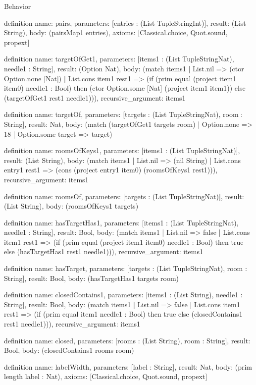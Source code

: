 \begin{lexlean}{Behavior}
\begin{semanticmodule}
definition{
  name: pairs,
  parameters: [entries : (List TupleStringInt)],
  result: (List String),
  body: (pairsMap1 entries),
  axioms: [Classical.choice, Quot.sound, propext]
}

definition{
  name: targetOfGet1,
  parameters: [items1 : (List TupleStringNat), needle1 : String],
  result: (Option Nat),
  body: (match items1
    | List.nil => (ctor Option.none [Nat])
    | List.cons item1 rest1 => (if (prim equal (project item1 item0) needle1 : Bool) then (ctor Option.some [Nat] (project item1 item1)) else (targetOfGet1 rest1 needle1))),
  recursive_argument: items1
}

definition{
  name: targetOf,
  parameters: [targets : (List TupleStringNat), room : String],
  result: Nat,
  body: (match (targetOfGet1 targets room) | Option.none => 18 | Option.some target => target)
}

definition{
  name: roomsOfKeys1,
  parameters: [items1 : (List TupleStringNat)],
  result: (List String),
  body: (match items1
    | List.nil => (nil String)
    | List.cons entry1 rest1 => (cons (project entry1 item0) (roomsOfKeys1 rest1))),
  recursive_argument: items1
}

definition{
  name: roomsOf,
  parameters: [targets : (List TupleStringNat)],
  result: (List String),
  body: (roomsOfKeys1 targets)
}

definition{
  name: hasTargetHas1,
  parameters: [items1 : (List TupleStringNat), needle1 : String],
  result: Bool,
  body: (match items1
    | List.nil => false
    | List.cons item1 rest1 => (if (prim equal (project item1 item0) needle1 : Bool) then true else (hasTargetHas1 rest1 needle1))),
  recursive_argument: items1
}

definition{
  name: hasTarget,
  parameters: [targets : (List TupleStringNat), room : String],
  result: Bool,
  body: (hasTargetHas1 targets room)
}

definition{
  name: closedContains1,
  parameters: [items1 : (List String), needle1 : String],
  result: Bool,
  body: (match items1
    | List.nil => false
    | List.cons item1 rest1 => (if (prim equal item1 needle1 : Bool) then true else (closedContains1 rest1 needle1))),
  recursive_argument: items1
}

definition{
  name: closed,
  parameters: [rooms : (List String), room : String],
  result: Bool,
  body: (closedContains1 rooms room)
}

definition{
  name: labelWidth,
  parameters: [label : String],
  result: Nat,
  body: (prim length label : Nat),
  axioms: [Classical.choice, Quot.sound, propext]
}


\end{semanticmodule}
\end{lexlean}

